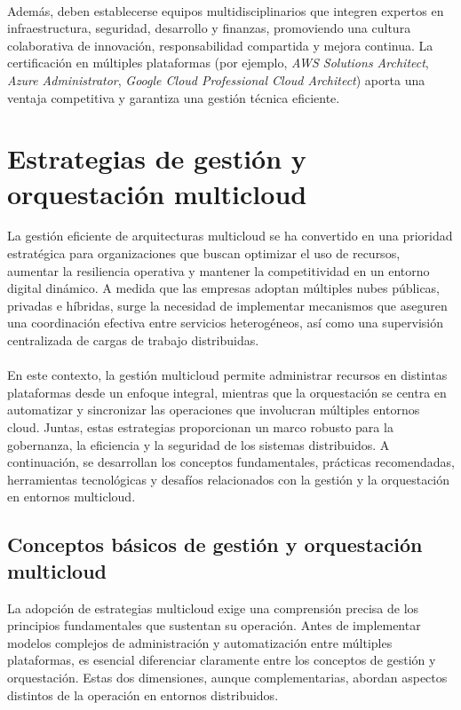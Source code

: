 {            \paragraph{}Además, deben establecerse equipos multidisciplinarios que integren expertos en infraestructura, seguridad, desarrollo y finanzas, promoviendo una cultura colaborativa de innovación, responsabilidad compartida y mejora continua. La certificación en múltiples plataformas (por ejemplo, \textit{AWS Solutions Architect}, \textit{Azure Administrator}, \textit{Google Cloud Professional Cloud Architect}) aporta una ventaja competitiva y garantiza una gestión técnica eficiente.

    \section{Estrategias de gestión y orquestación multicloud}
        La gestión eficiente de arquitecturas multicloud se ha convertido en una prioridad estratégica para organizaciones que buscan optimizar el uso de recursos, aumentar la resiliencia operativa y mantener la competitividad en un entorno digital dinámico. A medida que las empresas adoptan múltiples nubes públicas, privadas e híbridas, surge la necesidad de implementar mecanismos que aseguren una coordinación efectiva entre servicios heterogéneos, así como una supervisión centralizada de cargas de trabajo distribuidas.
            
        \paragraph{}En este contexto, la gestión multicloud permite administrar recursos en distintas plataformas desde un enfoque integral, mientras que la orquestación se centra en automatizar y sincronizar las operaciones que involucran múltiples entornos cloud. Juntas, estas estrategias proporcionan un marco robusto para la gobernanza, la eficiencia y la seguridad de los sistemas distribuidos. A continuación, se desarrollan los conceptos fundamentales, prácticas recomendadas, herramientas tecnológicas y desafíos relacionados con la gestión y la orquestación en entornos multicloud.
            
        \subsection{Conceptos básicos de gestión y orquestación multicloud}
            La adopción de estrategias multicloud exige una comprensión precisa de los principios fundamentales que sustentan su operación. Antes de implementar modelos complejos de administración y automatización entre múltiples plataformas, es esencial diferenciar claramente entre los conceptos de gestión y orquestación. Estas dos dimensiones, aunque complementarias, abordan aspectos distintos de la operación en entornos distribuidos.
            
}
